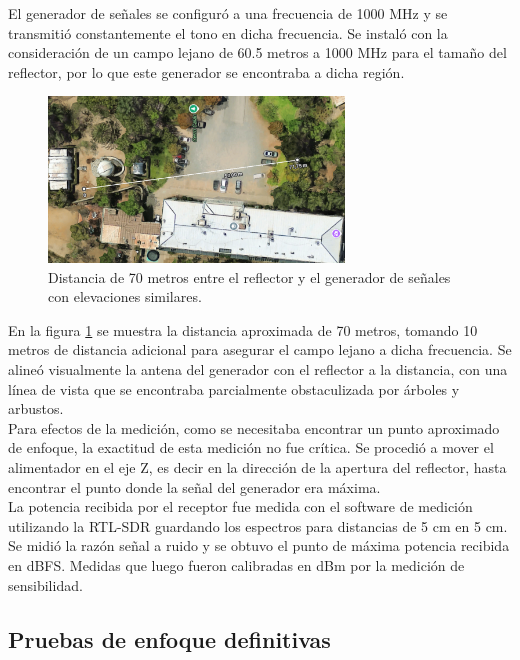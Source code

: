 El generador de señales se configuró a una frecuencia de 1000 MHz y se transmitió constantemente el tono en dicha frecuencia. Se instaló con la consideración de un campo lejano de 60.5 metros a 1000 MHz para el tamaño del reflector, por lo que este generador se encontraba a dicha región.\\

\begin{figure}
    \centering
    \includegraphics[width=0.7\textwidth]{img/70m_measure}
    \caption{Distancia de 70 metros entre el reflector y el generador de señales con elevaciones similares.}
    \label{fig:70m_measure}
\end{figure} 

En la figura \ref{fig:70m_measure} se muestra la distancia aproximada de 70 metros, tomando 10 metros de distancia adicional para asegurar el campo lejano a dicha frecuencia. Se alineó visualmente la antena del generador con el reflector a la distancia, con una línea de vista que se encontraba parcialmente  obstaculizada por árboles y arbustos.\\

Para efectos de la medición, como se necesitaba encontrar un punto aproximado de enfoque, la exactitud de esta medición no fue crítica. Se procedió a mover el alimentador en el eje Z, es decir en la dirección de la apertura del reflector, hasta encontrar el punto donde la señal del generador era máxima.\\

La potencia recibida por el receptor fue medida con el software de medición utilizando la RTL-SDR guardando los espectros para distancias de 5 cm en 5 cm. Se midió la razón señal a ruido y se obtuvo el punto de máxima potencia recibida en dBFS. Medidas que luego fueron calibradas en dBm por la medición de sensibilidad.\\

\subsection{Pruebas de enfoque definitivas}

